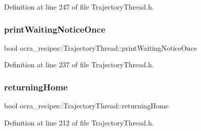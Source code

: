 Definition at line 247 of file Trajectory\+Thread.\+h.

\hypertarget{classocra__recipes_1_1TrajectoryThread_a4dbc25516ce41a0bc82c49e004a1b933}{}\label{classocra__recipes_1_1TrajectoryThread_a4dbc25516ce41a0bc82c49e004a1b933} 
\subsubsection{\texorpdfstring{print\+Waiting\+Notice\+Once}{printWaitingNoticeOnce}}
{\footnotesize\ttfamily bool ocra\+\_\+recipes\+::\+Trajectory\+Thread\+::print\+Waiting\+Notice\+Once\hspace{0.3cm}{\ttfamily [protected]}}



Definition at line 237 of file Trajectory\+Thread.\+h.

\hypertarget{classocra__recipes_1_1TrajectoryThread_a3835f5a143e350d53786d4469fce09f1}{}\label{classocra__recipes_1_1TrajectoryThread_a3835f5a143e350d53786d4469fce09f1} 
\subsubsection{\texorpdfstring{returning\+Home}{returningHome}}
{\footnotesize\ttfamily bool ocra\+\_\+recipes\+::\+Trajectory\+Thread\+::returning\+Home\hspace{0.3cm}{\ttfamily [protected]}}



Definition at line 212 of file Trajectory\+Thread.\+h.

\hypertarget{classocra__recipes_1_1TrajectoryThread_a28661ee4345695282b2a45baf33bd2af}{}\label{classocra__recipes_1_1TrajectoryThread_a28661ee4345695282b2a45baf33bd2af} 
